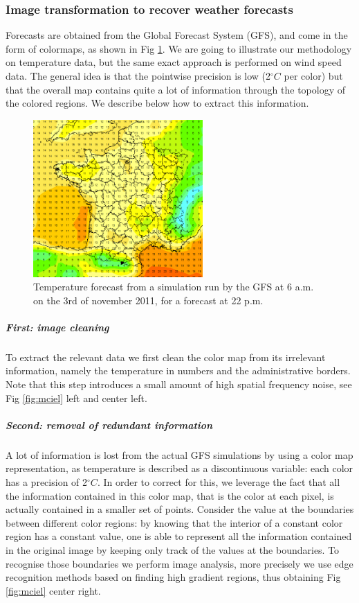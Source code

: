 \subsubsection{Image transformation to recover weather forecasts}
\label{picturemethodo}

Forecasts are obtained from the Global Forecast System (GFS), and come in the form of colormaps, as shown in Fig \ref{fig:refmeteociel}. We are going to illustrate our methodology on temperature data, but the same exact approach is performed on wind speed data. The general idea is that the pointwise precision is low (2$^{\circ}C$ per color) but that the overall map contains quite a lot of information through the topology of the colored regions. We describe below how to extract this information. 
 
\begin{figure}[!ht]
\begin{center} \includegraphics[height=60mm]{forqgis/ref-2011-11-03-15.png}
\end{center}
\caption{\small Temperature forecast from a simulation run by the GFS at 6 a.m. on the 3rd of november 2011, for a forecast at 22 p.m. }
\label{fig:refmeteociel}
\end{figure}

\subparagraph{First: image cleaning} To extract the relevant data we first clean the color map from its irrelevant information, namely the temperature in numbers and the administrative borders. Note that this step introduces a small amount of high spatial frequency noise, see Fig \ref{fig:mciel} left and center left. 

\subparagraph{Second: removal of redundant information} A lot of information is lost from the actual GFS simulations by using a color map representation, as temperature is described as a discontinuous variable: each color has a precision of 2$^{\circ}C$. In order to correct for this, we leverage the fact that all the information contained in this color map, that is the color at each pixel, is actually contained in a smaller set of points. Consider the value at the boundaries between different color regions: by knowing that the interior of a constant color region has a constant value, one is able to represent all the information contained in the original image by keeping only track of the values at the boundaries. To recognise those boundaries we perform image analysis, more precisely we use edge recognition methods based on finding high gradient regions, thus obtaining Fig \ref{fig:mciel} center right. 

